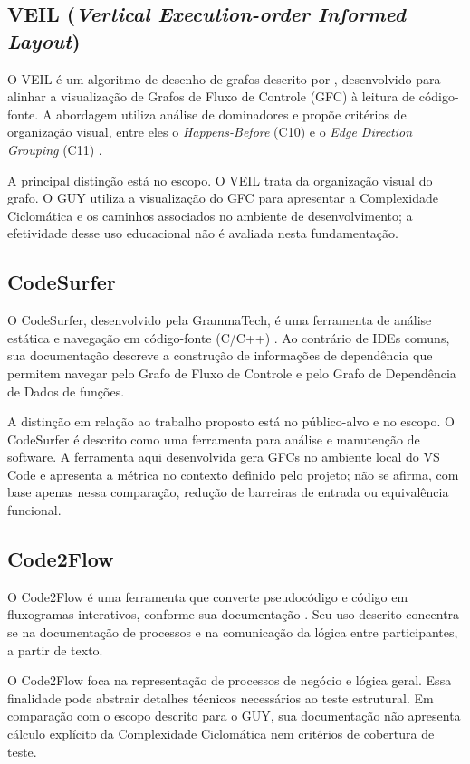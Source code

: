 \subsection{VEIL (\textit{Vertical Execution-order Informed Layout})}
O VEIL é um algoritmo de desenho de grafos descrito por , desenvolvido para alinhar a visualização de Grafos de Fluxo de Controle (GFC) à leitura de código-fonte. A abordagem utiliza análise de dominadores e propõe critérios de organização visual, entre eles o \textit{Happens-Before} (C10) e o \textit{Edge Direction Grouping} (C11) .

A principal distinção está no escopo. O VEIL trata da organização visual do grafo. O GUY utiliza a visualização do GFC para apresentar a Complexidade Ciclomática e os caminhos associados no ambiente de desenvolvimento; a efetividade desse uso educacional não é avaliada nesta fundamentação.

\subsection{CodeSurfer}
O CodeSurfer, desenvolvido pela GrammaTech, é uma ferramenta de análise estática e navegação em código-fonte (C/C++) . Ao contrário de IDEs comuns, sua documentação descreve a construção de informações de dependência que permitem navegar pelo Grafo de Fluxo de Controle e pelo Grafo de Dependência de Dados de funções.

A distinção em relação ao trabalho proposto está no público-alvo e no escopo. O CodeSurfer é descrito como uma ferramenta para análise e manutenção de software. A ferramenta aqui desenvolvida gera GFCs no ambiente local do VS Code e apresenta a métrica no contexto definido pelo projeto; não se afirma, com base apenas nessa comparação, redução de barreiras de entrada ou equivalência funcional.

\subsection{Code2Flow}
O Code2Flow é uma ferramenta que converte pseudocódigo e código em fluxogramas interativos, conforme sua documentação . Seu uso descrito concentra-se na documentação de processos e na comunicação da lógica entre participantes, a partir de texto.

O Code2Flow foca na representação de processos de negócio e lógica geral. Essa finalidade pode abstrair detalhes técnicos necessários ao teste estrutural. Em comparação com o escopo descrito para o GUY, sua documentação não apresenta cálculo explícito da Complexidade Ciclomática nem critérios de cobertura de teste.
